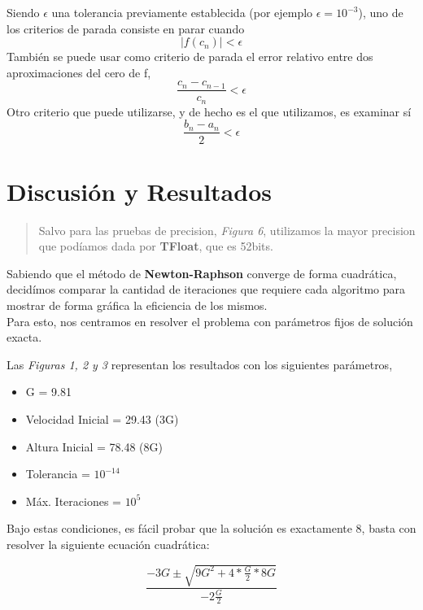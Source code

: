 \documentclass[a4paper]{article}
\begin{document}
Siendo $\epsilon$ una tolerancia previamente establecida (por ejemplo $\epsilon = 10^{-3}$), uno de los criterios de parada consiste en parar cuando 
\begin{equation}|f(c_n)| < \epsilon \end{equation}
También se puede usar como criterio de parada el error relativo entre dos aproximaciones del cero de f, 
\begin{equation}\frac{c_n - c_{n-1}}{c_n} < \epsilon \end{equation}
Otro criterio que puede utilizarse, y de hecho es el que utilizamos, es examinar sí \begin{equation}\frac{b_n - a_n}{2} < \epsilon\end{equation}

\newpage
\section{Discusión y Resultados}
\begin{quote}
Salvo para las pruebas de precision, \textit{Figura 6}, utilizamos la mayor precision que podíamos dada por \textbf{TFloat}, que es 52bits.
\end{quote}
\vspace{1em}

Sabiendo que el método de \textbf{Newton-Raphson} converge de forma cuadrática, decidímos comparar la cantidad de iteraciones que requiere cada algoritmo para mostrar de forma gráfica la eficiencia de los mismos. \\

Para esto, nos centramos en resolver el problema con parámetros fijos de solución exacta.

Las \textit{Figuras 1, 2 y 3} representan los resultados con los siguientes parámetros, 
\begin{itemize}
  \item{G = 9.81}
  \item{Velocidad Inicial = 29.43 (3G)} 
  \item{Altura Inicial = 78.48 (8G)} 
  \item{Tolerancia = $10^{-14}$} 
  \item{Máx. Iteraciones = $10^5$}
\end{itemize}

Bajo estas condiciones, es fácil probar que la solución es exactamente 8, basta con resolver la siguiente ecuación cuadrática:

\begin{displaymath}
  \frac{-3G \pm \sqrt{9G^2 + 4*\frac{G}{2}*8G}}{-2\frac{G}{2}}
\end{displaymath}
\end{document}
